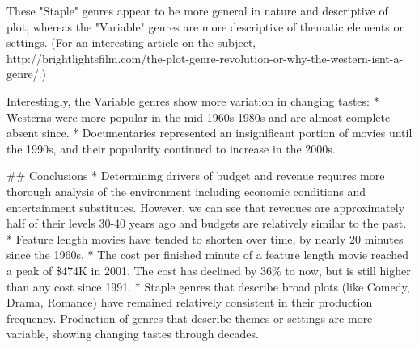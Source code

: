 \documentclass[11pt]{article}
\begin{document}
    These "Staple" genres appear to be more general in nature and
descriptive of plot, whereas the "Variable" genres are more descriptive
of thematic elements or settings. (For an interesting article on the
subject,
http://brightlightsfilm.com/the-plot-genre-revolution-or-why-the-western-isnt-a-genre/.)

Interestingly, the Variable genres show more variation in changing
tastes: * Westerns were more popular in the mid 1960s-1980s and are
almost complete absent since. * Documentaries represented an
insignificant portion of movies until the 1990s, and their popularity
continued to increase in the 2000s.

     \#\# Conclusions * Determining drivers of budget and revenue requires
more thorough analysis of the environment including economic conditions
and entertainment substitutes. However, we can see that revenues are
approximately half of their levels 30-40 years ago and budgets are
relatively similar to the past. * Feature length movies have tended to
shorten over time, by nearly 20 minutes since the 1960s. * The cost per
finished minute of a feature length movie reached a peak of \$474K in
2001. The cost has declined by 36\% to now, but is still higher than any
cost since 1991. * Staple genres that describe broad plots (like Comedy,
Drama, Romance) have remained relatively consistent in their production
frequency. Production of genres that describe themes or settings are
more variable, showing changing tastes through decades.


    
    
    
    
\end{document}
